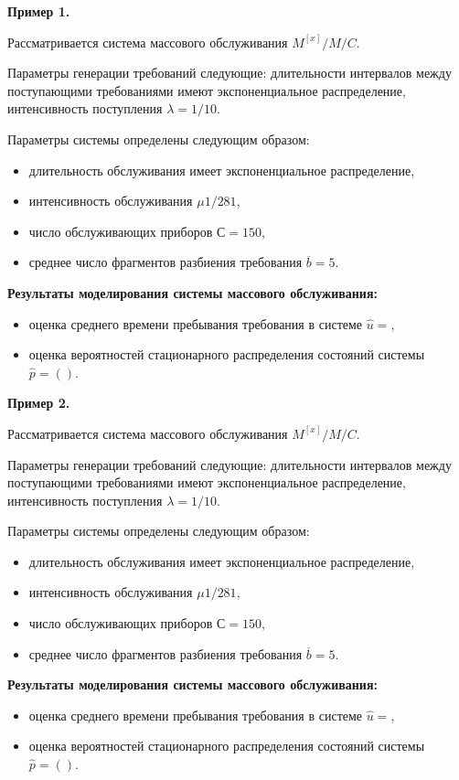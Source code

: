 \documentclass[bachelor, och, pract, times]{SCWorks}
\begin{document}
\textbf{Пример 1.}

Рассматривается система массового обслуживания $M^{[x]}/M/C$.

Параметры генерации требований следующие: длительности интервалов между поступающими требованиями имеют экспоненциальное распределение, интенсивность поступления $\lambda = 1/10$.

Параметры системы определены следующим образом: 

\begin{itemize}
    \item длительность обслуживания имеет экспоненциальное распределение, 
    \item интенсивность обслуживания $\mu 1/281$, 
    \item число обслуживающих приборов $С = 150$,
    \item среднее число фрагментов разбиения требования $\overline{b} = 5$.
\end{itemize}

\textbf{Результаты моделирования системы массового обслуживания:}
\begin{itemize}
    \item оценка среднего времени пребывания требования в системе $\hat{u} = $,
    \item оценка вероятностей стационарного распределения состояний системы $\hat{p} = ()$.
\end{itemize}

\textbf{Пример 2.}

Рассматривается система массового обслуживания $M^{[x]}/M/C$.

Параметры генерации требований следующие: длительности интервалов между поступающими требованиями имеют экспоненциальное распределение, интенсивность поступления $\lambda = 1/10$.

Параметры системы определены следующим образом: 

\begin{itemize}
    \item длительность обслуживания имеет экспоненциальное распределение, 
    \item интенсивность обслуживания $\mu 1/281$, 
    \item число обслуживающих приборов $С = 150$,
    \item среднее число фрагментов разбиения требования $\overline{b} = 5$.
\end{itemize}

\textbf{Результаты моделирования системы массового обслуживания:}
\begin{itemize}
    \item оценка среднего времени пребывания требования в системе $\hat{u} = $,
    \item оценка вероятностей стационарного распределения состояний системы $\hat{p} = ()$.
\end{itemize}
\end{document}
